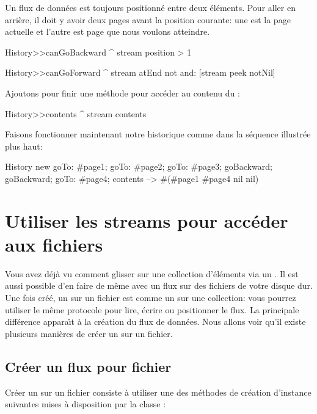 \documentclass[a4paper,10pt,twoside]{book}
\begin{document}
Un flux de donn\'ees est toujours positionn\'e entre deux \'el\'ements.
Pour aller en arri\`ere, il doit y avoir deux pages avant la position courante:
une est la page actuelle et l'autre est page que nous voulons atteindre.

\begin{code}{}
History>>canGoBackward
  ^ stream position > 1

History>>canGoForward
  ^ stream atEnd not and: [stream peek notNil]
\end{code}

Ajoutons pour finir une m\'ethode pour acc\'eder au contenu du \stream:
\begin{code}{}
History>>contents
  ^ stream contents
\end{code}

Faisons fonctionner maintenant notre historique 
comme dans la s\'equence illustr\'ee plus haut:
\begin{code}{}
History new
	goTo: #page1;
	goTo: #page2;
	goTo: #page3;
	goBackward;
	goBackward;
	goTo: #page4;
	contents --> #(#page1 #page4 nil nil)
\end{code}

\section{Utiliser les streams pour acc\'eder aux fichiers}

Vous avez d\'ej\`a vu comment glisser sur une collection d'\'el\'ements via
un \stream. Il est aussi possible d'en faire de m\^eme avec un flux 
sur des fichiers de votre disque dur.
Une fois cr\'e\'e, un \stream sur un fichier est comme un \stream sur
une collection: vous pourrez utiliser le m\^eme protocole pour lire, \'ecrire
ou positionner le flux.
La principale diff\'erence appara\^{\i}t \`a la cr\'eation du flux de donn\'ees.
Nous allons voir qu'il existe plusieurs mani\`eres de cr\'eer un \stream sur un fichier.

\subsection{Cr\'eer un flux pour fichier}
\label{sec:creat-file-stre}

Cr\'eer un \stream sur un fichier consiste \`a utiliser une des m\'ethodes
de cr\'eation d'instance suivantes mises \`a disposition par la classe
:
\end{document}
